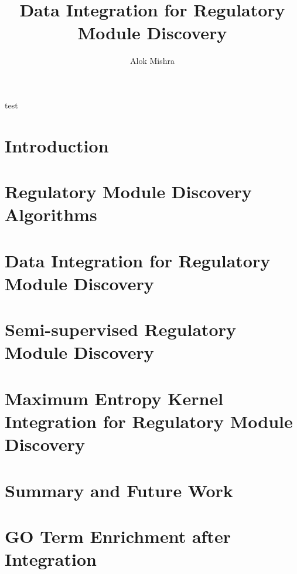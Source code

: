 \documentclass[a4paper,12pt,oneside]{book}
\begin{document}
\symbolfootnote

%

\title{\LARGE {\bf Data Integration for Regulatory Module Discovery}\\
 \vspace*{6mm}
}

\author{Alok Mishra}


\frontmatter
\maketitle





test
\body
\mediumlinespacing
\mainmatter
\chapter{Introduction}


\chapter{Regulatory Module Discovery Algorithms}


\chapter{Data Integration for Regulatory Module Discovery}
 

\chapter{Semi-supervised Regulatory Module Discovery}


\chapter{Maximum Entropy Kernel Integration for Regulatory Module Discovery} \label{chap_maxent}


\chapter{Summary and Future Work}


\appendix
\addappheadtotoc

\chapter{GO Term Enrichment after Integration} \label{appendix:go_enrichment_results}



\aloklinespacing
{}
 
%
\aloklinespacing

\end{document}
